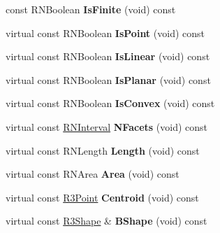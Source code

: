 \begin{DoxyCompactItemize}
\item 
const R\+N\+Boolean {\bfseries Is\+Finite} (void) const \hypertarget{class_r3_circle_a795fb77b0cbdd7eb3233a375da3ec350}{}\label{class_r3_circle_a795fb77b0cbdd7eb3233a375da3ec350}

\item 
virtual const R\+N\+Boolean {\bfseries Is\+Point} (void) const \hypertarget{class_r3_circle_aff793aae7084bbb76ea3047e5865b0a7}{}\label{class_r3_circle_aff793aae7084bbb76ea3047e5865b0a7}

\item 
virtual const R\+N\+Boolean {\bfseries Is\+Linear} (void) const \hypertarget{class_r3_circle_a76930897ccb495b8e1597356246faf66}{}\label{class_r3_circle_a76930897ccb495b8e1597356246faf66}

\item 
virtual const R\+N\+Boolean {\bfseries Is\+Planar} (void) const \hypertarget{class_r3_circle_af6d955e2c4d1446a7732218c8225869d}{}\label{class_r3_circle_af6d955e2c4d1446a7732218c8225869d}

\item 
virtual const R\+N\+Boolean {\bfseries Is\+Convex} (void) const \hypertarget{class_r3_circle_a3ab653d5336972442246edba6023ad2b}{}\label{class_r3_circle_a3ab653d5336972442246edba6023ad2b}

\item 
virtual const \hyperlink{class_r_n_interval}{R\+N\+Interval} {\bfseries N\+Facets} (void) const \hypertarget{class_r3_circle_a65eff958c61454a5e686679e1d11c78b}{}\label{class_r3_circle_a65eff958c61454a5e686679e1d11c78b}

\item 
virtual const R\+N\+Length {\bfseries Length} (void) const \hypertarget{class_r3_circle_a3d2fa906d2399b2e965829ba2d1cc732}{}\label{class_r3_circle_a3d2fa906d2399b2e965829ba2d1cc732}

\item 
virtual const R\+N\+Area {\bfseries Area} (void) const \hypertarget{class_r3_circle_a0cc7f03fc139d8d8798e1d825a4ed3f2}{}\label{class_r3_circle_a0cc7f03fc139d8d8798e1d825a4ed3f2}

\item 
virtual const \hyperlink{class_r3_point}{R3\+Point} {\bfseries Centroid} (void) const \hypertarget{class_r3_circle_adfeb26e1cd283b986bd0c23187e93dc4}{}\label{class_r3_circle_adfeb26e1cd283b986bd0c23187e93dc4}

\item 
virtual const \hyperlink{class_r3_shape}{R3\+Shape} \& {\bfseries B\+Shape} (void) const \hypertarget{class_r3_circle_acb981f6edb371f21493469b43e91dce5}{}\label{class_r3_circle_acb981f6edb371f21493469b43e91dce5}


\end{DoxyCompactItemize}
